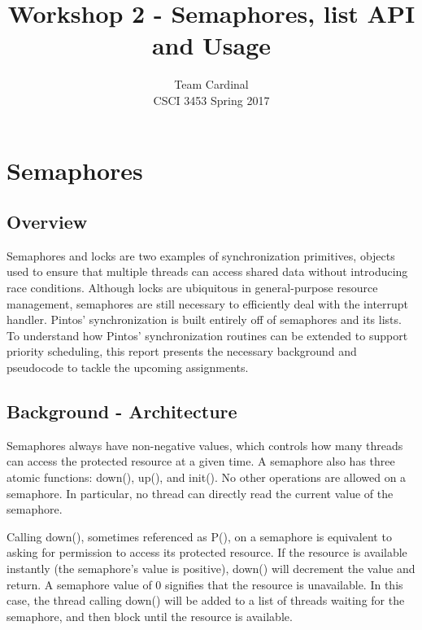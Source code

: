 \documentclass[11pt, letterpaper]{article}
\begin{document}

\title{Workshop 2 - Semaphores, list API and Usage}
\author{Team Cardinal\\CSCI 3453 Spring 2017}
\maketitle




\section{Semaphores}

\subsection{Overview}
Semaphores and locks are two examples of synchronization primitives, objects used to ensure that multiple threads can access shared data without introducing race conditions. Although locks are ubiquitous in general-purpose resource management, semaphores are still necessary to efficiently deal with the interrupt handler. Pintos’ synchronization is built entirely off of semaphores and its lists. To understand how Pintos’ synchronization routines can be extended to support priority scheduling, this report presents the necessary background and pseudocode to tackle the upcoming assignments.


\subsection{Background - Architecture}
Semaphores always have non-negative values, which controls how many threads can access the protected resource at a given time. A semaphore also has three atomic functions: down(), up(), and init(). No other operations are allowed on a semaphore. In particular, no thread can directly read the current value of the semaphore.

Calling down(), sometimes referenced as P(), on a semaphore is equivalent to asking for permission to access its protected resource. If the resource is available instantly (the semaphore’s value is positive), down() will decrement the value and return. A semaphore value of 0 signifies that the resource is unavailable. In this case, the thread calling down() will be added to a list of threads waiting for the semaphore, and then block until the resource is available.
\end{document}
